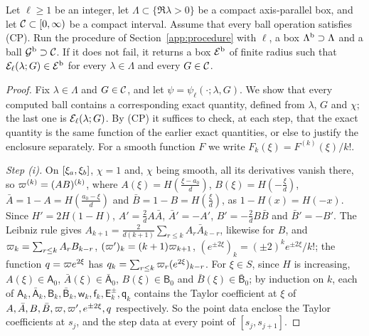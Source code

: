 \begin{proposition}
\label{prop:enclosure}
Let $\ell\ge1$ be an integer, let $\Lambda\subset\{\Re\lambda>0\}$ be a compact
axis-parallel box, and let $\mathcal{C}\subset[0,\infty)$ be a compact interval. Assume
that every ball operation satisfies \textup{(CP)}. Run the procedure of
Section~\ref{app:procedure} with $\ell$, a box $\Lambda^{\rm b}\supset\Lambda$ and a ball
$\mathcal G^{\rm b}\supset\mathcal{C}$. If it does not fail, it returns a box
$\mathcal{E}^{\rm b}$ of finite radius such that $\mathcal{E}_\ell(\lambda;G)\in\mathcal{E}^{\rm b}$ for every
$\lambda\in\Lambda$ and every $G\in\mathcal{C}$.
\end{proposition}
\begin{proof}
Fix $\lambda\in\Lambda$ and $G\in\mathcal{C}$, and let $\psi=\psi_\ell(\cdot;\lambda,G)$. We
show that every computed ball contains a corresponding exact quantity, defined
from $\lambda$, $G$ and $\chi$; the last one is $\mathcal{E}_\ell(\lambda;G)$. By (CP) it
suffices to check, at each step, that the exact quantity is the same function of
the earlier exact quantities, or else to justify the enclosure separately. For a
smooth function $F$ we write $F_k(\xi)=F^{(k)}(\xi)/k!$.

\emph{Step \textup{(i)}.} On $[\xi_a,\xi_b]$, $\chi=1$ and, $\chi$ being smooth, all its
derivatives vanish there, so $\varpi^{(k)}=(AB)^{(k)}$, where
$A(\xi)=H(\frac{\xi-a_0}d)$, $B(\xi)=H(-\frac\xi d)$, $\bar A=1-A=H(\frac{a_0-\xi}d)$ and
$\bar B=1-B=H(\frac\xi d)$, as $1-H(x)=H(-x)$. Since $H'=2H(1-H)$, $A'=\frac2dA\bar A$, $\bar A'=-A'$,
$B'=-\frac2dB\bar B$ and $\bar B'=-B'$. The Leibniz rule gives
$A_{k+1}=\frac2{d(k+1)}\sum_{r\le k}A_r\bar A_{k-r}$, likewise for $B$, and
$\varpi_k=\sum_{r\le k}A_rB_{k-r}$, $(\varpi')_k=(k+1)\varpi_{k+1}$,
$(e^{\pm2\xi})_k=(\pm2)^ke^{\pm2\xi}/k!$; the function $q=\varpi e^{2\xi}$ has
$q_k=\sum_{r\le k}\varpi_r(e^{2\xi})_{k-r}$. For $\xi\in S$, since $H$ is increasing,
$A(\xi)\in\mathsf A_0$, $\bar A(\xi)\in\bar{\mathsf A}_0$, $B(\xi)\in\mathsf B_0$ and
$\bar B(\xi)\in\bar{\mathsf B}_0$; by induction on $k$, each of
$\mathsf A_k,\bar{\mathsf A}_k,\mathsf B_k,\bar{\mathsf B}_k,\mathsf w_k,
\mathsf f_k,\mathsf E^\pm_k,\mathsf q_k$ contains the Taylor coefficient at $\xi$ of
$A,\bar A,B,\bar B,\varpi,\varpi',e^{\pm2\xi},q$ respectively. So the point data enclose
the Taylor coefficients at $s_j$, and the step data at every point of
$[s_j,s_{j+1}]$.


\end{proof}
